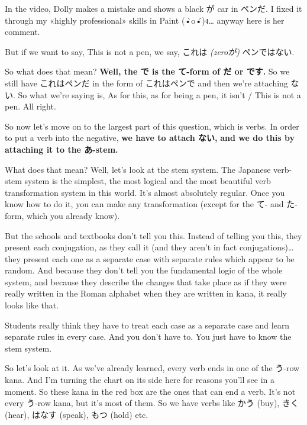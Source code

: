 {}

In the video, Dolly makes a mistake and shows a black が car in ペンだ.\crlf
I fixed it through my «highly professional» skills in Paint (•̀o•́)ง\ldots{} anyway here is her comment.

{}

But if we want to say, This is not a pen, we say, これは {\em (zeroが)} ペンではない.

{}

So what does that mean? {\bf Well, the で is the て-form of だ or です.} So we still have これはペンだ in the form of これはペンで and then we're attaching ない. So what we're saying is, As for this, as for being a pen, it isn't / This is not a pen. All right.

\stopsectionlevel

\startsectionlevel[title={Negative forms of verbs},reference={negative-forms-of-verbs}]

So now let's move on to the largest part of this question, which is verbs. In order to put a verb into the negative, {\bf we have to attach ない,} {\bf and we do this by attaching it to the あ-stem.}

{}

What does that mean? Well, let's look at the stem system. The Japanese verb-stem system is the simplest, the most logical and the most beautiful verb transformation system in this world. It's almost absolutely regular. Once you know how to do it, you can make any transformation (except for the て- and た-form, which you already know).

But the schools and textbooks don't tell you this. Instead of telling you this, they present each conjugation, as they call it (and they aren't in fact conjugations)\ldots{} they present each one as a separate case with separate rules which appear to be random. And because they don't tell you the fundamental logic of the whole system, and because they describe the changes that take place as if they were really written in the Roman alphabet when they are written in kana, it really looks like that.

\thinrule

Students really think they have to treat each case as a separate case and learn separate rules in every case. And you don't have to. You just have to know the stem system.

So let's look at it. As we've already learned, every verb ends in one of the う-row kana. And I'm turning the chart on its side here for reasons you'll see in a moment. So these kana in the red box are the ones that can end a verb. It's not every う-row kana, but it's most of them. So we have verbs like かう (buy), きく (hear), はなす (speak), もつ (hold) etc.

